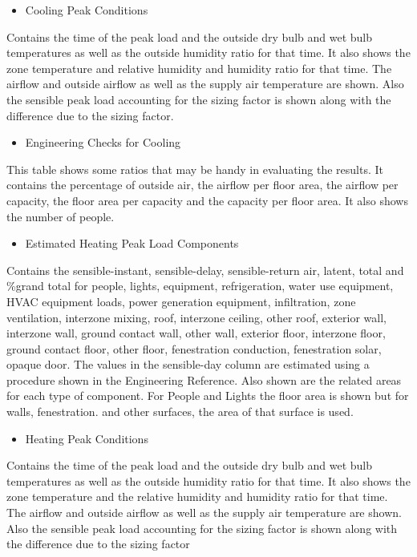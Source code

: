 \begin{itemize}
\tightlist
\item
  Cooling Peak Conditions
\end{itemize}

Contains the time of the peak load and the outside dry bulb and wet bulb temperatures as well as the outside humidity ratio for that time. It also shows the zone temperature and relative humidity and humidity ratio for that time. The airflow and outside airflow as well as the supply air temperature are shown. Also the sensible peak load accounting for the sizing factor is shown along with the difference due to the sizing factor.

\begin{itemize}
\tightlist
\item
  Engineering Checks for Cooling
\end{itemize}

This table shows some ratios that may be handy in evaluating the results. It contains the percentage of outside air, the airflow per floor area, the airflow per capacity, the floor area per capacity and the capacity per floor area. It also shows the number of people.


\begin{itemize}
\tightlist
\item
  Estimated Heating Peak Load Components
\end{itemize}

Contains the sensible-instant, sensible-delay, sensible-return air, latent, total and \%grand total for people, lights, equipment, refrigeration, water use equipment, HVAC equipment loads, power generation equipment, infiltration, zone ventilation, interzone mixing, roof, interzone ceiling, other roof, exterior wall, interzone wall, ground contact wall, other wall, exterior floor, interzone floor, ground contact floor, other floor, fenestration conduction, fenestration solar, opaque door. The values in the sensible-day column are estimated using a procedure shown in the Engineering Reference. Also shown are the related areas for each type of component. For People and Lights the floor area is shown but for walls, fenestration. and other surfaces, the area of that surface is used.

\begin{itemize}
\tightlist
\item
  Heating Peak Conditions
\end{itemize}

Contains the time of the peak load and the outside dry bulb and wet bulb temperatures as well as the outside humidity ratio for that time. It also shows the zone temperature and the relative humidity and humidity ratio for that time. The airflow and outside airflow as well as the supply air temperature are shown. Also the sensible peak load accounting for the sizing factor is shown along with the difference due to the sizing factor

